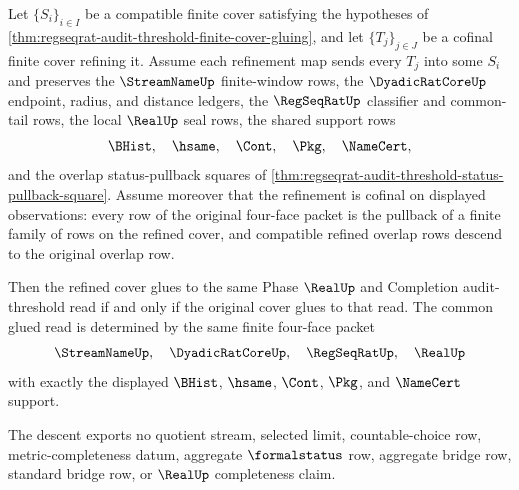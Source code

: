 \begin{theorem}
\label{thm:regseqrat-four-face-status-cofinal-descent}
Let $\{S_i\}_{i \in I}$ be a compatible finite cover satisfying the hypotheses of \autoref{thm:regseqrat-audit-threshold-finite-cover-gluing}, and let $\{T_j\}_{j \in J}$ be a cofinal finite cover refining it. Assume each refinement map sends every $T_j$ into some $S_i$ and preserves the $\StreamNameUp$ finite-window rows, the $\DyadicRatCoreUp$ endpoint, radius, and distance ledgers, the $\RegSeqRatUp$ classifier and common-tail rows, the local $\RealUp$ seal rows, the shared support rows
$$
\BHist,\quad \hsame,\quad \Cont,\quad \Pkg,\quad \NameCert,
$$
and the overlap status-pullback squares of \autoref{thm:regseqrat-audit-threshold-status-pullback-square}. Assume moreover that the refinement is cofinal on displayed observations: every row of the original four-face packet is the pullback of a finite family of rows on the refined cover, and compatible refined overlap rows descend to the original overlap row.

Then the refined cover glues to the same Phase $\RealUp$ and Completion audit-threshold read if and only if the original cover glues to that read. The common glued read is determined by the same finite four-face packet
$$
\StreamNameUp,\quad \DyadicRatCoreUp,\quad \RegSeqRatUp,\quad \RealUp
$$
with exactly the displayed $\BHist$, $\hsame$, $\Cont$, $\Pkg$, and $\NameCert$ support.

The descent exports no quotient stream, selected limit, countable-choice row, metric-completeness datum, aggregate $\formalstatus$ row, aggregate bridge row, standard bridge row, or $\RealUp$ completeness claim.
\end{theorem}
